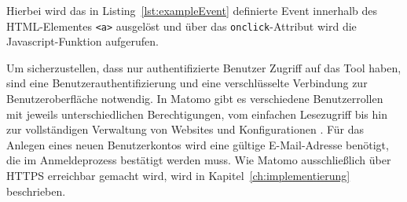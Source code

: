 Hierbei wird das in Listing~\ref{lst:exampleEvent} definierte Event innerhalb des HTML-Elementes \texttt{<a>} ausgelöst und über das \texttt{onclick}-Attribut wird die Javascript-Funktion aufgerufen.

Um sicherzustellen, dass nur authentifizierte Benutzer Zugriff auf das Tool haben, sind eine Benutzerauthentifizierung und eine verschlüsselte Verbindung zur Benutzeroberfläche notwendig. In Matomo gibt es verschiedene Benutzerrollen mit jeweils unterschiedlichen Berechtigungen, vom einfachen Lesezugriff bis hin zur vollständigen Verwaltung von Websites und Konfigurationen \parencite{MatomoRBAC}. Für das Anlegen eines neuen Benutzerkontos wird eine gültige E-Mail-Adresse benötigt, die im Anmeldeprozess bestätigt werden muss. Wie Matomo ausschließlich über HTTPS erreichbar gemacht wird, wird in Kapitel~\ref{ch:implementierung} beschrieben.  